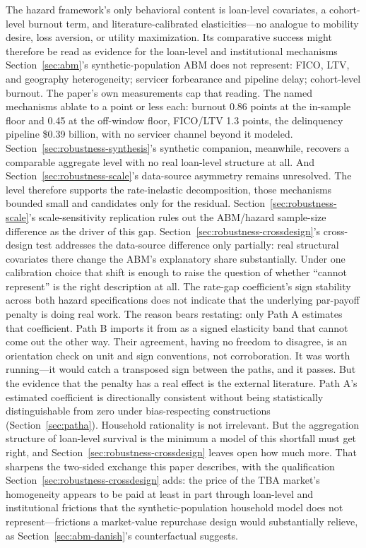 \documentclass[12pt]{article}
\begin{document}
The hazard framework's only behavioral content is loan-level covariates, a cohort-level burnout term, and literature-calibrated elasticities---no analogue to mobility desire, loss aversion, or utility maximization. Its comparative success might therefore be read as evidence for the loan-level and institutional mechanisms Section~\ref{sec:abm}'s synthetic-population ABM does not represent: FICO, LTV, and geography heterogeneity; servicer forbearance and pipeline delay; cohort-level burnout. The paper's own measurements cap that reading. The named mechanisms ablate to a point or less each: burnout 0.86 points at the in-sample floor and 0.45 at the off-window floor, FICO/LTV 1.3 points, the delinquency pipeline \$0.39 billion, with no servicer channel beyond it modeled. Section~\ref{sec:robustness-synthesis}'s synthetic companion, meanwhile, recovers a comparable aggregate level with no real loan-level structure at all. And Section~\ref{sec:robustness-scale}'s data-source asymmetry remains unresolved. The level therefore supports the rate-inelastic decomposition, those mechanisms bounded small and candidates only for the residual. Section~\ref{sec:robustness-scale}'s scale-sensitivity replication rules out the ABM/hazard sample-size difference as the driver of this gap. Section~\ref{sec:robustness-crossdesign}'s cross-design test addresses the data-source difference only partially: real structural covariates there change the ABM's explanatory share substantially. Under one calibration choice that shift is enough to raise the question of whether ``cannot represent'' is the right description at all. The rate-gap coefficient's sign stability across both hazard specifications does not indicate that the underlying par-payoff penalty is doing real work. The reason bears restating: only Path A estimates that coefficient. Path B imports it from \citet{liebersohn2024} as a signed elasticity band that cannot come out the other way. Their agreement, having no freedom to disagree, is an orientation check on unit and sign conventions, not corroboration. It was worth running---it would catch a transposed sign between the paths, and it passes. But the evidence that the penalty has a real effect is the external literature. Path A's estimated coefficient is directionally consistent without being statistically distinguishable from zero under bias-respecting constructions (Section~\ref{sec:patha}). Household rationality is not irrelevant. But the aggregation structure of loan-level survival is the minimum a model of this shortfall must get right, and Section~\ref{sec:robustness-crossdesign} leaves open how much more. That sharpens the two-sided exchange this paper describes, with the qualification Section~\ref{sec:robustness-crossdesign} adds: the price of the TBA market's homogeneity appears to be paid at least in part through loan-level and institutional frictions that the synthetic-population household model does not represent---frictions a market-value repurchase design would substantially relieve, as Section~\ref{sec:abm-danish}'s counterfactual suggests.
\clearpage
\end{document}
